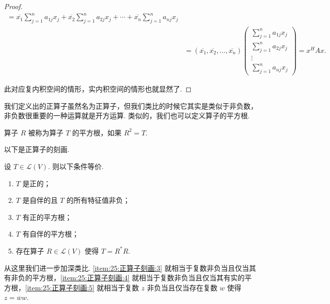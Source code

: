 \begin{proof}
\begin{align*}
        = \overline{x_1}\sum_{j = 1}^{n}a_{1j}x_{j} + \overline{x_2}\sum_{j = 1}^{n}a_{2j}x_{j} + \cdots + \overline{x_n}\sum_{j = 1}^{n}a_{nj}x_{j} \\
         & = (\overline{x_1}, \overline{x_2}, \ldots, \overline{x_n})
        \begin{pmatrix}
            \sum\limits_{j = 1}^{n}a_{1j}x_{j} \\
            \sum\limits_{j = 1}^{n}a_{2j}x_{j} \\
            \vdots                             \\
            \sum\limits_{j = 1}^{n}a_{nj}x_{j}
        \end{pmatrix}
        = x^{H}Ax.
    \end{align*}

    此对应复内积空间的情形，实内积空间的情形也就显然了.
\end{proof}

我们定义出的正算子虽然名为正算子，但我们类比的时候它其实是类似于非负数，非负数很重要的一种运算就是开方运算. 类似的，我们也可以定义算子的平方根.

\begin{definition}
    算子 $ R $ 被称为算子 $ T $ 的平方根，如果 $ R^{2} = T $.
\end{definition}

以下是正算子的刻画.

\begin{theorem}
    设 $ T \in \mathcal{L}(V) $. 则以下条件等价.
    \begin{enumerate}
        \item \label{item:25:正算子刻画:1}
              $ T $ 是正的；

        \item \label{item:25:正算子刻画:2}
              $ T $ 是自伴的且 $ T $ 的所有特征值非负；

        \item \label{item:25:正算子刻画:3}
              $ T $ 有正的平方根；

        \item \label{item:25:正算子刻画:4}
              $ T $ 有自伴的平方根；

        \item \label{item:25:正算子刻画:5}
              存在算子 $ R \in \mathcal{L}(V) $ 使得 $ T = R^{*}R $.
    \end{enumerate}
\end{theorem}

从这里我们进一步加深类比. \ref*{item:25:正算子刻画:3} 就相当于复数非负当且仅当其有非负的平方根，\ref*{item:25:正算子刻画:4} 就相当于复数非负当且仅当其有实的平方根，\ref*{item:25:正算子刻画:5} 就相当于复数 $ z $ 非负当且仅当存在复数 $ w $ 使得 $ z = \overline{w}w $.

